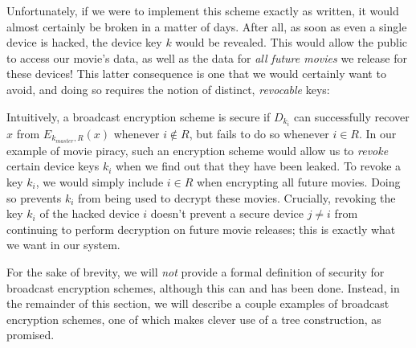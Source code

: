Unfortunately, if we were to implement this scheme exactly as written,
it would almost certainly be broken in a matter of days. After all, as
soon as even a single device is hacked, the device key \(k\) would be
revealed. This would allow the public to access our movie's data, as
well as the data for \emph{all future movies} we release for these
devices! This latter consequence is one that we would certainly want to
avoid, and doing so requires the notion of distinct, \emph{revocable}
keys:

\hypertarget{broadcastdef}{}

Intuitively, a broadcast encryption scheme is secure if \(D_{k_i}\) can
successfully recover \(x\) from \(E_{k_{master}, R}(x)\) whenever
\(i \notin R\), but fails to do so whenever \(i \in R\). In our example
of movie piracy, such an encryption scheme would allow us to
\emph{revoke} certain device keys \(k_i\) when we find out that they
have been leaked. To revoke a key \(k_i\), we would simply include
\(i \in R\) when encrypting all future movies. Doing so prevents \(k_i\)
from being used to decrypt these movies. Crucially, revoking the key
\(k_i\) of the hacked device \(i\) doesn't prevent a secure device
\(j \neq i\) from continuing to perform decryption on future movie
releases; this is exactly what we want in our system.

For the sake of brevity, we will \emph{not} provide a formal definition
of security for broadcast encryption schemes, although this can and has
been done. Instead, in the remainder of this section, we will describe a
couple examples of broadcast encryption schemes, one of which makes
clever use of a tree construction, as promised.

